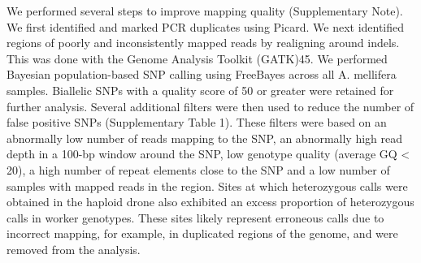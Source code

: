 \documentclass[12pt]{report}
\begin{document}
We performed several steps to improve mapping quality (Supplementary Note). We first identified and marked PCR duplicates using Picard. We next identified regions of poorly and inconsistently mapped reads by realigning around indels. This was done with the Genome Analysis Toolkit (GATK)45. We performed Bayesian population-based SNP calling using FreeBayes across all A. mellifera samples. Biallelic SNPs with a quality score of 50 or greater were retained for further analysis. Several additional filters were then used to reduce the number of false positive SNPs (Supplementary Table 1). These filters were based on an abnormally low number of reads mapping to the SNP, an abnormally high read depth in a 100-bp window around the SNP, low genotype quality (average GQ < 20), a high number of repeat elements close to the SNP and a low number of samples with mapped reads in the region. Sites at which heterozygous calls were obtained in the haploid drone also exhibited an excess proportion of heterozygous calls in worker genotypes. These sites likely represent erroneous calls due to incorrect mapping, for example, in duplicated regions of the genome, and were removed from the analysis. 
	
\end{document}
